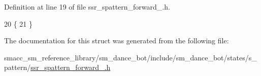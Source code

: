 Definition at line 19 of file ssr\+\_\+spattern\+\_\+forward\+\_.\+h.


\begin{DoxyCode}
20   \{
21   \}
\end{DoxyCode}


The documentation for this struct was generated from the following file\+:\begin{DoxyCompactItemize}
\item 
smacc\+\_\+sm\+\_\+reference\+\_\+library/sm\+\_\+dance\+\_\+bot/include/sm\+\_\+dance\+\_\+bot/states/s\+\_\+pattern/\hyperlink{ssr__spattern__forward__1_8h}{ssr\+\_\+spattern\+\_\+forward\+\_.\+h}\end{DoxyCompactItemize}
